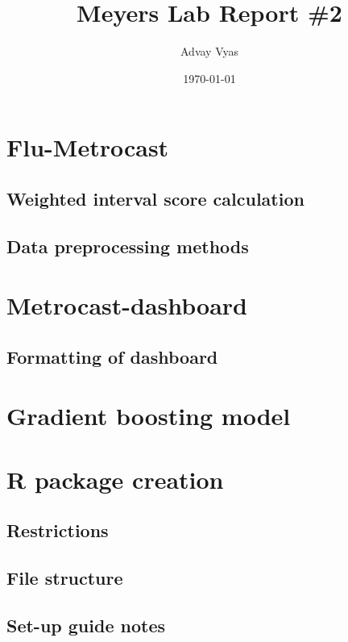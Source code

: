 \documentclass[12pt]{article}
\title{Meyers Lab Report \#2}
\author{Advay Vyas}
\date{\today}
\begin{document}
\maketitle

\tableofcontents

\section{Flu-Metrocast}
\subsection{Weighted interval score calculation}
\subsection{Data preprocessing methods}
\section{Metrocast-dashboard}
\subsection{Formatting of dashboard}
\section{Gradient boosting model}
\section{R package creation}
\subsection{Restrictions}
\subsection{File structure}
\subsection{Set-up guide notes}
\end{document}
